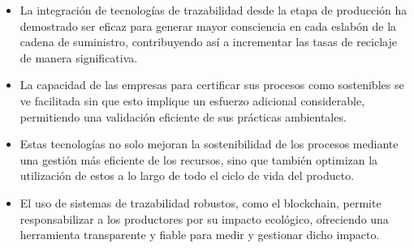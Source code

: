 \documentclass[main.tex]{subfiles}
\begin{document}
\begin{itemize}
    \item La integración de tecnologías de trazabilidad desde la etapa de producción ha demostrado ser eficaz para generar mayor consciencia en cada eslabón de la cadena de suministro, contribuyendo así a incrementar las tasas de reciclaje de manera significativa.
    \item La capacidad de las empresas para certificar sus procesos como sostenibles se ve facilitada sin que esto implique un esfuerzo adicional considerable, permitiendo una validación eficiente de sus prácticas ambientales.
    \item Estas tecnologías no solo mejoran la sostenibilidad de los procesos mediante una gestión más eficiente de los recursos, sino que también optimizan la utilización de estos a lo largo de todo el ciclo de vida del producto.
    \item El uso de sistemas de trazabilidad robustos, como el blockchain, permite responsabilizar a los productores por su impacto ecológico, ofreciendo una herramienta transparente y fiable para medir y gestionar dicho impacto.
\end{itemize}
\end{document}
